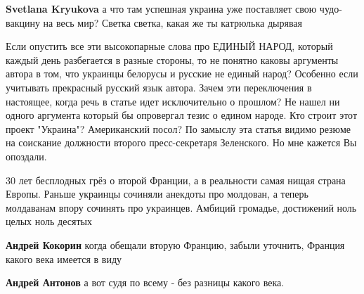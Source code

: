 \begin{itemize}
\begin{itemize}
\textbf{Svetlana Kryukova} а что там успешная украина уже поставляет свою чудо-вакцину на весь мир? Светка светка, какая же ты катрюлька дырявая

\end{itemize}

 

Если опустить все эти высокопарные слова про ЕДИНЫЙ НАРОД, который каждый день
разбегается в разные стороны, то не понятно каковы аргументы автора в том, что
украинцы белорусы и русские не единый народ? Особенно если учитывать прекрасный
русский язык автора. Зачем эти переключения в настоящее, когда речь в статье
идет исключительно о прошлом? Не нашел ни одного аргумента который бы
опровергал тезис о едином народе. Кто строит этот проект "Украина"?
Американский посол? По замыслу эта статья видимо резюме на соискание должности
второго пресс-секретаря Зеленского. Но мне кажется Вы опоздали.


 

30 лет бесплодных грёз о второй Франции, а в реальности самая нищая страна
Европы. Раньше украинцы сочиняли анекдоты про молдован, а теперь молдаванам
впору сочинять про украинцев. Амбиций громадье, достижений ноль целых ноль
десятых

\begin{itemize}
 
\textbf{Андрей Кокорин} когда обещали вторую Францию, забыли уточнить, Франция какого века имеется в виду

 
\textbf{Андрей Антонов} а вот судя по всему - без разницы какого века.
\end{itemize}


\end{itemize}
